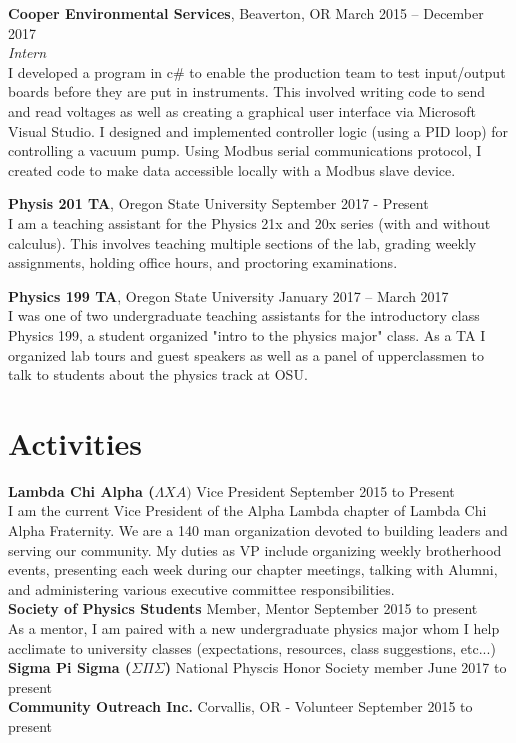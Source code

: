 \documentclass[margin,line, 11pt]{res}
\begin{document}
\begin{resume}
{\bf Cooper Environmental Services}, Beaverton, OR \hfill{March 2015 -- December 2017}\\
{\em Intern} \\
I developed a program in c\# to enable the production team to test input/output boards before they are put in instruments. This involved writing code to send and read voltages as well as creating a graphical user interface via Microsoft Visual Studio. I designed and implemented controller logic (using a PID loop) for controlling a vacuum pump. Using Modbus serial communications protocol, I created code to make data accessible locally with a Modbus slave device. 

{\bf Physis 201 TA}, Oregon State University \hfill{September 2017 - Present} \\
I am a teaching assistant for the Physics 21x and 20x series (with and without calculus). This involves teaching multiple sections of the lab, grading weekly assignments, holding office hours, and proctoring examinations. 


{\bf Physics 199 TA}, Oregon State University \hfill{January 2017 -- March 2017}\\
I was one of two undergraduate teaching assistants for the introductory class Physics 199, a student organized "intro to the physics major" class. As a TA I organized lab tours and guest speakers as well as a panel of upperclassmen to talk to students about the physics track at OSU. 

\section{\sc Activities} 
	{\bf Lambda Chi Alpha ($\Lambda XA)$} Vice President \hfill September 2015 to Present\\
	I am the current Vice President of the Alpha Lambda chapter of Lambda Chi Alpha Fraternity. We are a 140 man organization devoted to building leaders and serving our community. My duties as VP include organizing weekly brotherhood events, presenting each week during our chapter meetings, talking with Alumni, and administering various executive committee responsibilities. \\	
	{\bf Society of Physics Students} Member, Mentor \hfill September 2015 to present\\ 
	As a mentor, I am paired with a new undergraduate physics major whom I help acclimate to university classes (expectations, resources, class suggestions, etc...) \\	
	{\bf Sigma Pi Sigma ($\Sigma \Pi \Sigma$)} National Physcis Honor Society member \hfill June 2017 to present \\	
	{\bf Community Outreach Inc.} Corvallis, OR - Volunteer \hfill September 2015 to present


\end{resume}
\end{document}
